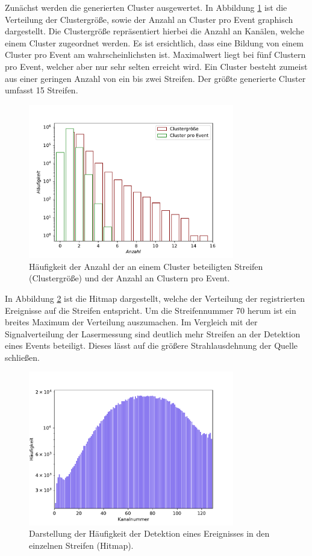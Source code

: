 Zunächst werden die generierten Cluster ausgewertet. In Abbildung \ref{fig:cluster} ist die Verteilung der Clustergröße, sowie der Anzahl an Cluster pro Event graphisch dargestellt. Die Clustergröße repräsentiert hierbei die Anzahl an Kanälen, welche einem Cluster zugeordnet werden.
Es ist ersichtlich, dass eine Bildung von einem Cluster pro Event am wahrscheinlichsten ist. Maximalwert liegt bei fünf Clustern pro Event, welcher aber nur sehr selten erreicht wird.
Ein Cluster besteht zumeist aus einer geringen Anzahl von ein bis zwei Streifen. Der größte generierte Cluster umfasst 15 Streifen.
\begin{figure}
  \centering
  \includegraphics[width=0.8\textwidth]{plots/Cluster.pdf}
  \caption{Häufigkeit der Anzahl der an einem Cluster beteiligten Streifen (Clustergröße) und der Anzahl an Clustern pro Event.}
  \label{fig:cluster}
\end{figure}
\FloatBarrier
In Abbildung \ref{fig:hitmap} ist die Hitmap dargestellt, welche der Verteilung der registrierten Ereignisse auf die Streifen entspricht. Um die Streifennummer 70 herum ist ein breites Maximum der Verteilung auszumachen. Im Vergleich mit der Signalverteilung der Lasermessung sind deutlich mehr Streifen an der Detektion eines Events beteiligt. Dieses lässt auf die größere Strahlausdehnung der Quelle schließen.
\begin{figure}
  \centering
  \includegraphics[width=0.8\textwidth]{plots/hitmap.pdf}
  \caption{Darstellung der Häufigkeit der Detektion eines Ereignisses in den einzelnen Streifen (Hitmap).}
  \label{fig:hitmap}
\end{figure}
